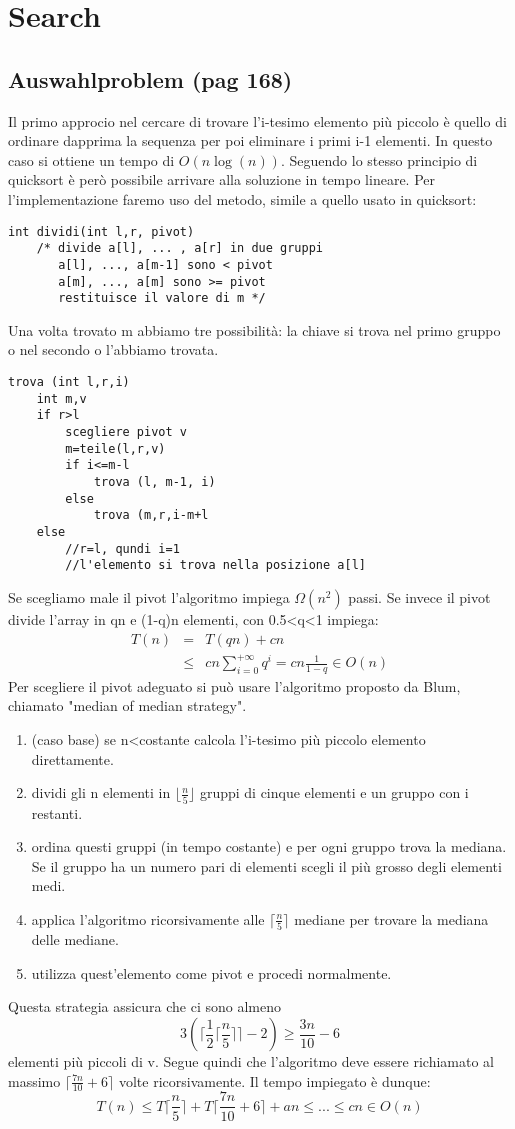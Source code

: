 \documentclass[a4paper]{book}
\begin{document}
\chapter{Search}
\section{Auswahlproblem (pag 168)}
Il primo approcio nel cercare di trovare l'i-tesimo elemento più piccolo è quello di ordinare dapprima la sequenza per poi eliminare i primi i-1 elementi. In questo caso si ottiene un tempo di $O(n \log (n))$. Seguendo lo stesso principio di quicksort è però possibile arrivare alla soluzione in tempo lineare. Per l'implementazione faremo uso del metodo, simile a quello usato in quicksort:
\begin{lstlisting}
int dividi(int l,r, pivot)
	/* divide a[l], ... , a[r] in due gruppi
	   a[l], ..., a[m-1] sono < pivot
	   a[m], ..., a[m] sono >= pivot
	   restituisce il valore di m */
\end{lstlisting}
Una volta trovato m abbiamo tre possibilità: la chiave si trova nel primo gruppo o nel secondo o l'abbiamo trovata.
\begin{lstlisting}
trova (int l,r,i)
	int m,v
	if r>l
		scegliere pivot v
		m=teile(l,r,v)
		if i<=m-l
			trova (l, m-1, i)
		else
			trova (m,r,i-m+l
	else
		//r=l, qundi i=1
		//l'elemento si trova nella posizione a[l]	 			
\end{lstlisting}
Se scegliamo male il pivot l'algoritmo impiega $\Omega (n^2)$ passi. Se invece il pivot divide l'array in qn e (1-q)n elementi, con 0.5<q<1 impiega:
\begin{eqnarray}
T(n) &=& T(qn)+cn \nonumber \\
& \leq & cn \sum_{i=0}^{+\infty} q^i = cn \frac{1}{1-q} \in O(n)
\end{eqnarray}
Per scegliere il pivot adeguato si può usare l'algoritmo proposto da Blum, chiamato "median of median strategy".
\begin{enumerate}
\item (caso base) se n<costante calcola l'i-tesimo più piccolo elemento direttamente.
\item dividi gli n elementi in $\lfloor \frac{n}{5} \rfloor$ gruppi di cinque elementi e un gruppo con i restanti. 
\item ordina questi gruppi (in tempo costante) e per ogni gruppo trova la mediana. Se il gruppo ha un numero pari di elementi scegli il più grosso degli elementi medi. 
\item applica l'algoritmo ricorsivamente alle $\lceil \frac{n}{5} \rceil$ mediane per trovare la mediana delle mediane.
\item utilizza quest'elemento come pivot e procedi normalmente.
\end{enumerate}
Questa strategia assicura che ci sono almeno 
$$ 3(\lceil \frac{1}{2} \lceil \frac{n}{5} \rceil \rceil -2) \geq \frac{3n}{10} -6$$
elementi più piccoli di v. Segue quindi che l'algoritmo deve essere richiamato al massimo $ \lceil \frac{7n}{10} + 6 \rceil$ volte ricorsivamente. Il tempo impiegato è dunque:
$$ T(n) \leq T\lceil \frac{n}{5} \rceil +T \lceil \frac{7n}{10} +6 \rceil + an \leq ... \leq cn \in O(n) $$
\end{document}
